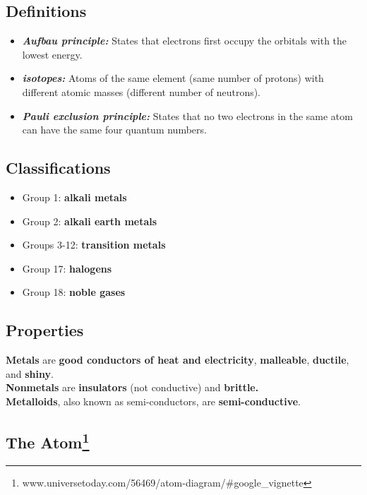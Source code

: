 \documentclass[a4paper, 12pt]{article}
\begin{document}
\subsection*{Definitions}
\begin{itemize}[leftmargin=*, nosep]
    \item \textbf{\textit{Aufbau principle:}} States that electrons first occupy the orbitals with the lowest energy.
    \item \textbf{\textit{isotopes:}} Atoms of the same element (same number of protons) with different atomic masses (different number of neutrons).
    \item \textbf{\textit{Pauli exclusion principle:}} States that no two electrons in the same atom can have the same four quantum numbers.
\end{itemize}

\subsection*{Classifications}

\begin{itemize}[leftmargin=*, nosep]
    \item Group 1: \textbf{alkali metals}
    \item Group 2: \textbf{alkali earth metals}
    \item Groups 3-12: \textbf{transition metals}
    \item Group 17: \textbf{halogens}
    \item Group 18: \textbf{noble gases}
\end{itemize}

\subsection*{Properties}
\textbf{Metals} are \textbf{good conductors of heat and electricity}, \textbf{malleable}, \textbf{ductile}, and \textbf{shiny}.
\\
\textbf{Nonmetals} are \textbf{insulators} (not conductive) and \textbf{brittle.}
\\
\textbf{Metalloids}, also known as semi-conductors, are \textbf{semi-conductive}.

\subsection*{The Atom\footnote{www.universetoday.com/56469/atom-diagram/\#google\_vignette}}
\end{document}
